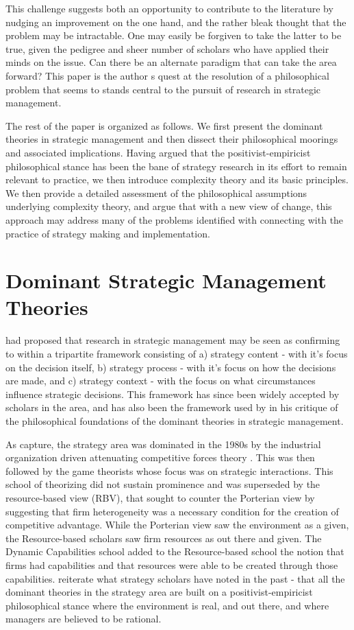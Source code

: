 \documentclass[12pt,letterpaper]{article}
\begin{document}
This challenge suggests both an opportunity to contribute to the literature by nudging an improvement on the one hand, and the rather bleak thought that the problem may be intractable. One may easily be forgiven to take the  latter  to be true, given the pedigree and sheer number of scholars who have applied their minds on the issue.  Can there be an alternate paradigm that can take the area forward? This paper is the author \textquotesingle s  quest at the resolution of a philosophical problem that seems to stands central to the pursuit of research in strategic management.

The rest of the paper is organized as follows. We first present the dominant theories in strategic management and then dissect their philosophical moorings and associated implications. Having argued that the positivist-empiricist philosophical stance has been the bane of strategy research in its effort to remain relevant to practice, we then introduce complexity theory and its basic principles. We then provide a detailed assessment of the philosophical assumptions underlying complexity theory, and argue that with a new view of change, this approach may address many of the problems identified with connecting with the practice of strategy making and implementation. 

\section{Dominant Strategic Management Theories}\label{S:DominantTheories}
\cite{Pettigrew1988} had proposed that research in strategic management may be seen as confirming to within a tripartite framework consisting of a) strategy content - with it's focus on the decision itself, b) strategy process - with it's focus on how the decisions are made, and c) strategy context - with the focus on what circumstances influence strategic decisions. This framework has since been widely accepted by scholars in the area, and has also been the framework used by \cite{Rasche2008} in his critique of the philosophical foundations of the dominant theories in strategic management.  

As \cite{Teece1997b} capture, the strategy area was dominated in the 1980s by the industrial organization driven attenuating competitive forces theory \citep{Porter1980}. This was then followed by the game theorists whose focus was on strategic interactions. This school of theorizing did not sustain prominence and was superseded by the resource-based view (RBV), that sought to counter the Porterian view by suggesting that firm heterogeneity was a necessary condition for the creation of competitive advantage. While the Porterian view saw the environment as a given, the Resource-based scholars saw firm resources as out there and given. The Dynamic Capabilities school added to the Resource-based school the notion that firms had capabilities and that resources were able to be created through those capabilities. \cite{Teece1997b} reiterate what strategy scholars have noted in the past - that all the dominant theories in the strategy area are built on a positivist-empiricist philosophical stance where the environment is real, and out there, and where managers are believed to be rational.
\end{document}
